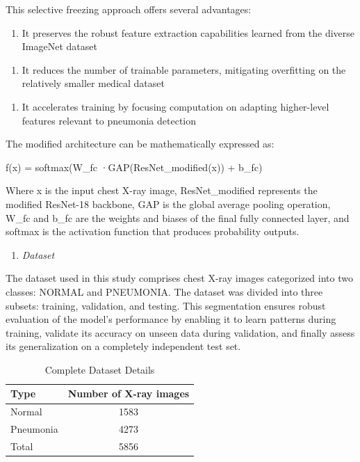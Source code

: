 \documentclass[
  twocolumn,
  10pt,
  a4paper,
  journal
]{IEEEtran}
\begin{document}
This selective freezing approach offers several advantages:

\begin{enumerate}
\def\labelenumi{\arabic{enumi}.}
\item
  It preserves the robust feature extraction capabilities learned from the diverse ImageNet dataset
\end{enumerate}

\begin{enumerate}
\def\labelenumi{\arabic{enumi}.}
\setcounter{enumi}{1}
\item
  It reduces the number of trainable parameters, mitigating overfitting on the relatively smaller medical dataset
\end{enumerate}

\begin{enumerate}
\def\labelenumi{\arabic{enumi}.}
\setcounter{enumi}{2}
\item
  It accelerates training by focusing computation on adapting higher-level features relevant to pneumonia detection
\end{enumerate}

The modified architecture can be mathematically expressed as:

f(x) = softmax(W\_fc ·GAP(ResNet\_modified(x)) + b\_fc)

Where x is the input chest X-ray image, ResNet\_modified represents the modified ResNet-18 backbone, GAP is the global average pooling operation, W\_fc and b\_fc are the weights and biases of the final fully connected layer, and softmax is the activation function that produces probability outputs.

\begin{enumerate}
\def\labelenumi{\Alph{enumi}.}
\setcounter{enumi}{2}
\item
  \emph{Dataset}
\end{enumerate}

The dataset used in this study comprises chest X-ray images categorized into two classes: NORMAL and PNEUMONIA. The dataset was divided into three subsets: training, validation, and testing. This segmentation ensures robust evaluation of the model's performance by enabling it to learn patterns during training, validate its accuracy on unseen data during validation, and finally assess its generalization on a completely independent test set.

\begin{table}[t]
\centering
\caption{Complete Dataset Details}
\label{tab:dataset}
\begin{tabular}{lc}
\hline
\textbf{Type} & \textbf{Number of X-ray images} \\
\hline
Normal & 1583 \\
Pneumonia & 4273 \\
\hline
Total & 5856 \\
\hline
\end{tabular}
\end{table}
\end{document}
